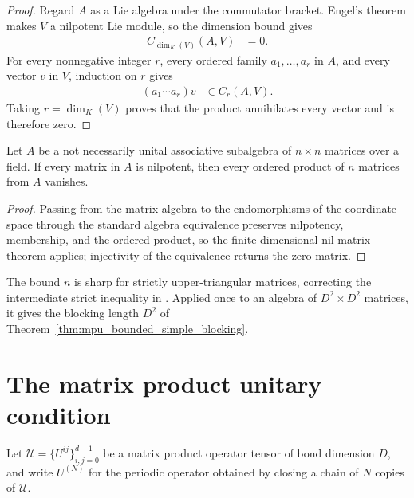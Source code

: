 \begin{proof}\leanok
    Regard $A$ as a Lie algebra under the commutator bracket.  Engel's theorem
    makes $V$ a nilpotent Lie module, so the dimension bound gives
    \begin{align}
        C_{\dim_K(V)}(A,V) & = 0.
    \end{align}
    For every nonnegative integer $r$, every ordered family
    $a_1,\ldots,a_r$ in $A$, and every vector $v$ in $V$, induction on $r$
    gives
    \begin{align}
        (a_1\cdots a_r)v & \in C_r(A,V).
    \end{align}
    Taking $r=\dim_K(V)$ proves that the product annihilates every vector and
    is therefore zero.
\end{proof}

\begin{lemma}
    \label{thm:mpu_nil_matrices}
    \leanok
    Let $A$ be a not necessarily unital associative subalgebra of
    $n\times n$ matrices over a field.  If every matrix in $A$ is nilpotent,
    then every ordered product of $n$ matrices from $A$ vanishes.
\end{lemma}

\begin{proof}\leanok
    Passing from the matrix algebra to the endomorphisms of the coordinate space
    through the standard algebra equivalence preserves nilpotency, membership, and the
    ordered product, so the finite-dimensional nil-matrix
    theorem applies; injectivity of the equivalence returns the zero matrix.
\end{proof}

The bound $n$ is sharp for strictly upper-triangular matrices, correcting the
intermediate strict inequality in \cite{Cirac2017MPU}.  Applied once to an
algebra of $D^2\times D^2$ matrices, it gives the blocking length $D^2$ of
Theorem~\ref{thm:mpu_bounded_simple_blocking}.

\section{The matrix product unitary condition}

Let $\mathcal U=\{U^{ij}\}_{i,j=0}^{d-1}$ be a matrix product operator tensor of
bond dimension $D$, and write $U^{(N)}$ for the periodic operator obtained by
closing a chain of $N$ copies of $\mathcal U$.

